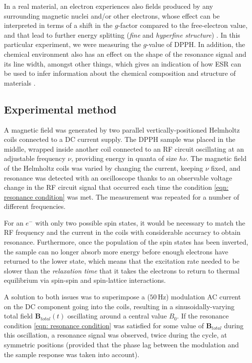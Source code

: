 \documentclass[a4paper]{jpconf}
\numberwithin{equation}{section}
\begin{document}
In a real material, an electron experiences also fields produced by any surrounding magnetic nuclei and/or other electrons, whose effect can be interpreted in terms of a shift in the $g$-factor compared to the free-electron value, and that lead to further energy splitting (\emph{fine} and \emph{hyperfine structure}) \cite{Lancaster, Ball}. In this particular experiment, we were measuring the $g$-value of DPPH. In addition, the chemical environment also has an effect on the shape of the resonance signal and its line width, amongst other things, which gives an indication of how ESR can be used to infer information about the chemical composition and structure of materials \cite{Lancaster}. 

\subsection{Experimental method}\label{section: method}
A magnetic field was generated by two parallel vertically-positioned Helmholtz coils connected to a DC current supply. The DPPH sample was placed in the middle, wrapped inside another coil connected to an RF circuit oscillating at an adjustable frequency $\nu$, providing energy in quanta of size $h\nu$. The magnetic field of the Helmholtz coils was varied by changing the current, keeping $\nu$ fixed, and resonance was detected with an oscilloscope thanks to an observable voltage change in the RF circuit signal that occurred each time the condition \eqref{eqn: resonance condition} was met. The measurement was repeated for a number of different frequencies.  

For an $e^-$ with only two possible spin states, it would be necessary to match the RF frequency and the current in the coils with considerable accuracy to obtain resonance. Furthermore, once the population of the spin states has been inverted, the sample can no longer absorb more energy before enough electrons have returned to the lower state, which means that the excitation rate needed to be slower than the \emph{relaxation time} that it takes the electrons to return to thermal equilibrium via spin-spin and spin-lattice interactions. 

A solution to both issues was to superimpose a ($50 \, \si{\hertz}$) modulation AC current on the DC component going into the coils, resulting in a sinusoidally-varying total field $\mathbf{B}_{total}(t)$ oscillating around a central value $B_0$. If the resonance condition \eqref{eqn: resonance condition} was satisfied for some value of $\mathbf{B}_{total}$ during this oscillation, a resonance signal was observed, twice during the cycle, at symmetric positions (provided that the phase lag between the modulation and the sample response was taken into account). 
\end{document}
